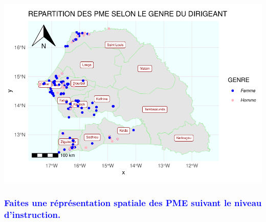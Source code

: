 \documentclass[
]{article}
\begin{document}
\begin{center}\includegraphics{Projet_R_ISE_1_files/figure-latex/unnamed-chunk-35-1} \end{center}

\hfill\break

\textcolor{blue}{\subsubsection{Faites une réprésentation spatiale des PME suivant le niveau d'instruction.}}

\hfill\break
\end{document}
